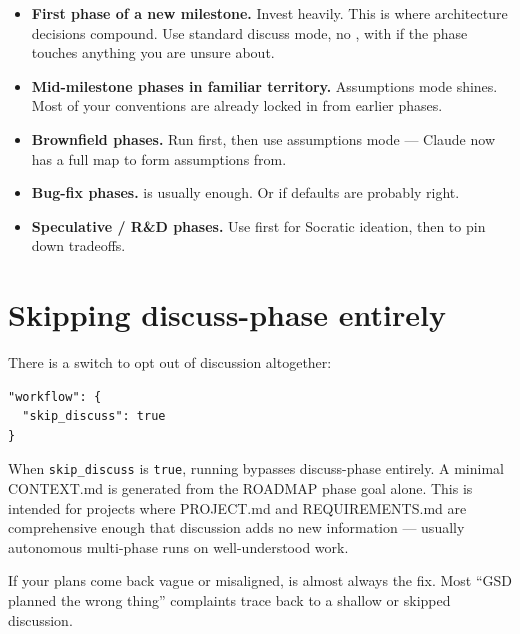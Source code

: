 \documentclass[11pt,letterpaper,openany]{book}
\begin{document}
\begin{itemize}[itemsep=2pt]
  \item \textbf{First phase of a new milestone.} Invest heavily. This is where architecture decisions compound. Use standard discuss mode, no , with  if the phase touches anything you are unsure about.
  \item \textbf{Mid-milestone phases in familiar territory.} Assumptions mode shines. Most of your conventions are already locked in from earlier phases.
  \item \textbf{Brownfield phases.} Run  first, then use assumptions mode --- Claude now has a full map to form assumptions from.
  \item \textbf{Bug-fix phases.}  is usually enough. Or  if defaults are probably right.
  \item \textbf{Speculative / R\&D phases.} Use  first for Socratic ideation, then  to pin down tradeoffs.
\end{itemize}

\section{Skipping discuss-phase entirely}

There is a switch to opt out of discussion altogether:

\begin{lstlisting}
"workflow": {
  "skip_discuss": true
}
\end{lstlisting}

When \texttt{skip\_discuss} is \texttt{true}, running  bypasses discuss-phase entirely. A minimal CONTEXT.md is generated from the ROADMAP phase goal alone. This is intended for projects where PROJECT.md and REQUIREMENTS.md are comprehensive enough that discussion adds no new information --- usually autonomous multi-phase runs on well-understood work.

\begin{gsdwarning}
If your plans come back vague or misaligned,  is almost always the fix. Most ``GSD planned the wrong thing'' complaints trace back to a shallow or skipped discussion.
\end{gsdwarning}
\end{document}
